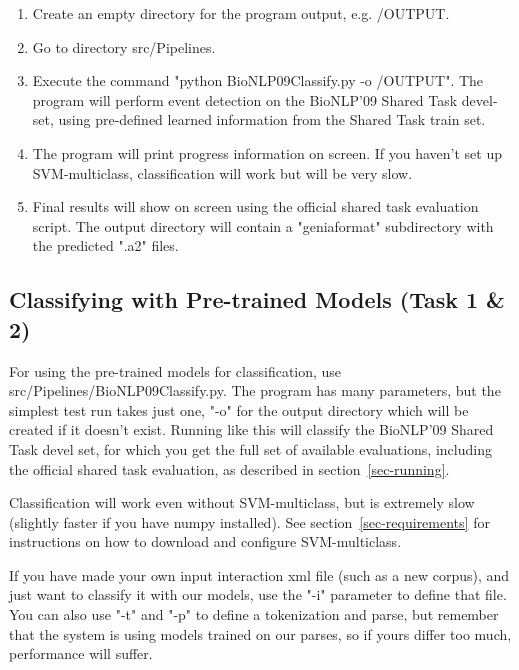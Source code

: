 \documentclass[a4paper,12pt]{article}
\begin{document}
\begin{enumerate}

\item Create an empty directory for the program output, e.g. /OUTPUT.

\item Go to directory src/Pipelines.

\item Execute the command "python BioNLP09Classify.py -o /OUTPUT". The program will
perform event detection on the BioNLP'09 Shared Task devel-set, using pre-defined
learned information from the Shared Task train set.

\item The program will print progress information on screen. If you haven't set up
SVM-multiclass, classification will work but will be very slow.

\item Final results will show on screen using the official shared task evaluation
script. The output directory will contain a "geniaformat" subdirectory with the
predicted ".a2" files.

\end{enumerate}

\subsection{Classifying with Pre-trained Models (Task 1 \& 2)}

For using the pre-trained models for classification, use
src/Pipelines/BioNLP09Classify.py. The program has many parameters, but the
simplest test run takes just one, "-o" for the output directory which will be
created if it doesn't exist. Running like this will classify the BioNLP'09 Shared
Task devel set, for which you get the full set of available evaluations,
including the official shared task evaluation, as described in
section~\ref{sec-running}.

Classification will work even without SVM-multiclass, but is extremely slow
(slightly faster if you have numpy installed). See
section~\ref{sec-requirements} for instructions on how to download and configure SVM-multiclass.

If you have made your own input interaction xml file (such as a new corpus), and
just want to classify it with our models, use the "-i" parameter to define that
file. You can also use "-t" and "-p" to define a tokenization and parse, but
remember that the system is using models trained on our parses, so if yours
differ too much, performance will suffer.
\end{document}
